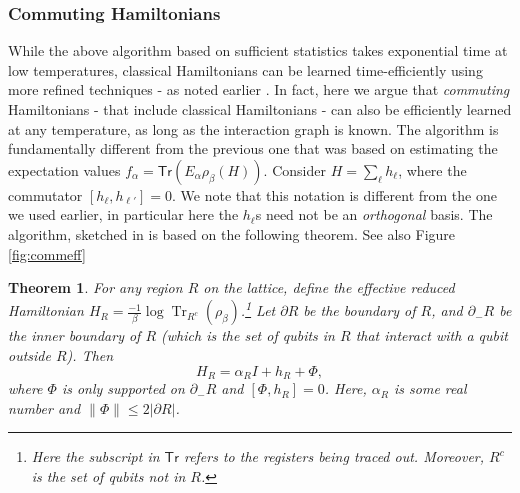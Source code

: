 \documentclass[11pt]{article}
\DeclareMathOperator{\tr}{Tr}
\newcommand{\Tr}{\textsf{Tr}}
\newtheorem{theorem}{Theorem}
\begin{document}
\subsubsection{Commuting Hamiltonians}
While the above algorithm based on sufficient statistics takes exponential time at low temperatures, classical Hamiltonians can be learned time-efficiently using more refined techniques - as noted earlier \cite{Bresler_learning, Interaction_screening, Klivans_learning}.  In fact, here we argue that \emph{commuting} Hamiltonians - that include classical Hamiltonians - can also be efficiently learned at any temperature, as long as the interaction graph is known. The algorithm is fundamentally different from the previous one that was based on estimating the expectation values $f_\alpha=\Tr(E_\alpha \rho_\beta(H))$. Consider $H=\sum_\ell h_\ell$, where the commutator $[h_\ell, h_{\ell'}]=0$. We note that this notation is different from the one we used earlier, in particular here the $h_\ell$s need not be an \textit{orthogonal} basis. The algorithm, sketched in \cite{AAKScomm21} is based on the following theorem. See also Figure \ref{fig:commeff}

\begin{theorem}
\label{thm:commeffec}
\cite{AAKScomm21} For any region $R$ on the lattice, define the effective reduced Hamiltonian $H_R= \frac{-1}{\beta}\log \tr_{R^c}\left(\rho_\beta\right)$.\footnote{Here the subscript in $\Tr$ refers to the registers being traced out. Moreover, $R^c$ is the set of qubits not in $R$.} Let $\partial R$ be the boundary of $R$, and $\partial_{-} R$ be the inner boundary of $R$ (which is the set of qubits in $R$ that interact with a qubit outside $R$). Then
$$
H_R= \alpha_RI + h_R + \Phi,
$$
where $\Phi$ is only supported on $\partial_{-} R$ and $[\Phi, h_R]=0$. Here, $\alpha_R$ is some real number and $\|\Phi\|\leq 2|\partial R|$.
\end{theorem}
\end{document}
